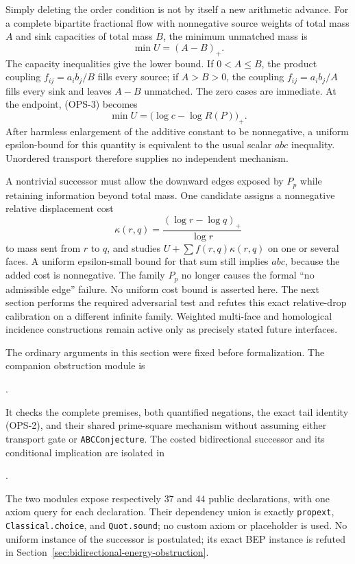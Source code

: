 Simply deleting the order condition is not by itself a new arithmetic
advance.  For a complete bipartite fractional flow with nonnegative source
weights of total mass $A$ and sink capacities of total mass $B$, the minimum
unmatched mass is
\[
 \min U=(A-B)_+.
\tag{OPS-3}
\]
The capacity inequalities give the lower bound.  If $0<A\le B$, the product
coupling $f_{ij}=a_i b_j/B$ fills every source; if $A>B>0$, the coupling
$f_{ij}=a_i b_j/A$ fills every sink and leaves $A-B$ unmatched.  The zero
cases are immediate.  At the endpoint, (OPS-3) becomes
\[
 \min U=\bigl(\log c-\log R(P)\bigr)_+.
\]
After harmless enlargement of the additive constant to be nonnegative, a
uniform epsilon-bound for this quantity is equivalent to the usual scalar
$abc$ inequality.  Unordered transport therefore supplies no independent
mechanism.

A nontrivial successor must allow the downward edges exposed by $P_p$ while
retaining information beyond total mass.  One candidate assigns a
nonnegative relative displacement cost
\[
 \kappa(r,q)=\frac{(\log r-\log q)_+}{\log r}
\]
to mass sent from $r$ to $q$, and studies $U+\sum f(r,q)\kappa(r,q)$ on one
or several faces.  A uniform epsilon-small bound for that sum still implies
$abc$, because the added cost is nonnegative.  The family $P_p$ no longer
causes the formal ``no admissible edge'' failure.  No uniform cost bound is
asserted here.  The next section performs the required adversarial test and
refutes this exact relative-drop calibration on a different infinite family.
Weighted multi-face and homological incidence constructions remain active only
as precisely stated future interfaces.

The ordinary arguments in this section were fixed before formalization.  The
companion obstruction module is
\begin{center}
.
\end{center}
It checks the complete premises, both quantified negations, the exact tail
identity (OPS-2), and their shared prime-square mechanism without assuming
either transport gate or
\texttt{ABCConjecture}.  The costed bidirectional successor and its conditional
implication are isolated in
\begin{center}
.
\end{center}
The two modules expose respectively $37$ and $44$ public declarations, with
one axiom query for each declaration.  Their dependency union is exactly
\texttt{propext}, \texttt{Classical.choice}, and \texttt{Quot.sound}; no
custom axiom or placeholder is used.  No uniform instance of the successor is
postulated; its exact BEP instance is refuted in
Section~\ref{sec:bidirectional-energy-obstruction}.
